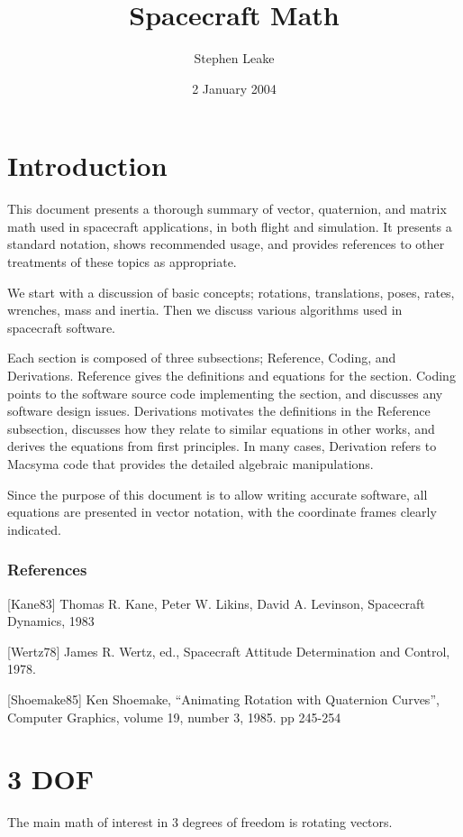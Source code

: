 \documentclass{book}
\numberwithin{equation}{subsection}
\begin{document}
\title{Spacecraft Math}
\author{Stephen Leake}
\date{ 2 January 2004}
\maketitle

\chapter {Introduction}

This document presents a thorough summary of vector, quaternion, and
matrix math used in spacecraft applications, in both flight and
simulation. It presents a standard notation, shows recommended usage,
and provides references to other treatments of these topics as
appropriate.

We start with a discussion of basic concepts; rotations, translations,
poses, rates, wrenches, mass and inertia. Then we discuss various
algorithms used in spacecraft software.

Each section is composed of three subsections; Reference, Coding, and
Derivations. Reference gives the definitions and equations for the
section. Coding points to the software source code implementing the
section, and discusses any software design issues. Derivations
motivates the definitions in the Reference subsection, discusses how
they relate to similar equations in other works, and derives the
equations from first principles. In many cases, Derivation refers to
Macsyma code that provides the detailed algebraic manipulations.

Since the purpose of this document is to allow writing accurate
software, all equations are presented in vector notation, with the
coordinate frames clearly indicated.

\subsection {References}
[Kane83] Thomas R. Kane, Peter W. Likins, David A. Levinson,
Spacecraft Dynamics, 1983

[Wertz78] James R. Wertz, ed., Spacecraft Attitude Determination and
Control, 1978.

[Shoemake85] Ken Shoemake, ``Animating Rotation with Quaternion
Curves'', Computer Graphics, volume 19, number 3, 1985. pp 245-254

\chapter {3 DOF}
The main math of interest in 3 degrees of freedom is rotating vectors.
\end{document}
